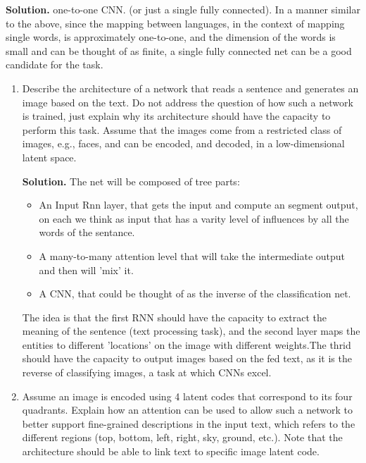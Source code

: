 \documentclass{article}
\begin{document}
\begin{enumerate}
\begin{enumerate}
  \textbf{Solution.} one-to-one CNN. (or just a single fully connected). In a manner similar to the above, since the mapping between languages, in the context of mapping single words, is approximately one-to-one, and the dimension of the words is small and can be thought of as finite, a single fully connected net can be a good candidate for the task.  
    \end{enumerate}
    \begin{enumerate}
  \item Describe the architecture of a network that reads a sentence and generates an image based on the text. Do not address the question of how such a network is trained, just explain why its architecture should have the capacity to perform this task. Assume that the images come from a restricted class of images, e.g., faces, and can be encoded, and decoded, in a low-dimensional latent space. 

    \textbf{Solution.} The net will be composed of tree parts: 
    \begin{itemize}
      \item An Input Rnn layer, that gets the input and compute an segment output, on each we think as input that has a varity level of influences by all the words of the sentance.   
      \item A many-to-many attention level that will take the intermediate output and then will 'mix' it.
      \item A CNN, that could be thought of as the inverse of the classification net. 
    \end{itemize}  The idea is that the first RNN should have the capacity to extract the meaning of the sentence (text processing task), and the second layer maps the entities to different 'locations' on the image with different weights.The thrid should have the capacity to output images based on the fed text, as it is the reverse of classifying images, a task at which CNNs excel.
      \item Assume an image is encoded using 4 latent codes that correspond to its four quadrants. Explain how an attention can be used to allow such a network to better support fine-grained descriptions in the input text, which refers to the different regions (top, bottom, left, right, sky, ground, etc.). Note that the architecture should be able to link text to specific image latent code.


\end{enumerate}
\end{enumerate}
\end{document}
